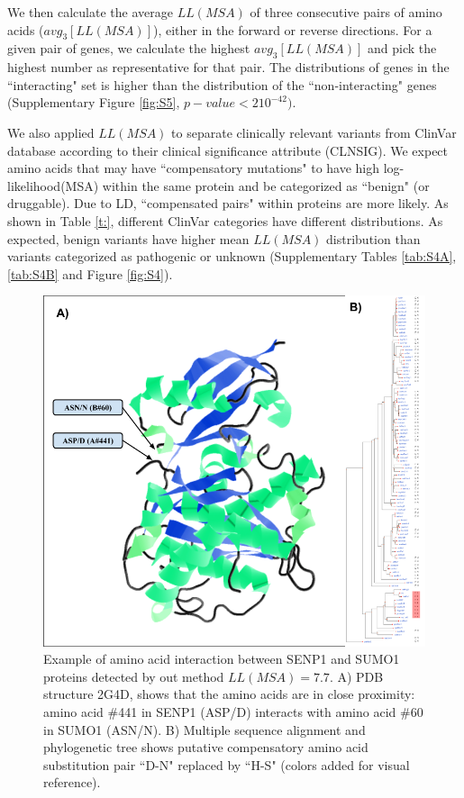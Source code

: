 We then calculate the average $LL(MSA)$ of three consecutive pairs of amino acids ($avg_3[LL(MSA)]$), either in the forward or reverse directions. For a given pair of genes, we calculate the highest $avg_3[LL(MSA)]$ and pick the highest number as representative for that pair. The distributions of genes in the ``interacting" set is higher than the distribution of the  ``non-interacting" genes (Supplementary Figure \ref{fig:S5}, $p-value < 2 10^{-42})$.

We also applied $LL(MSA)$ to separate clinically relevant variants from ClinVar database \cite{REF} according to their clinical significance attribute (CLNSIG). We expect amino acids that may have ``compensatory mutations" to have high log-likelihood(MSA) within the same protein and be categorized as ``benign" (or druggable). Due to LD, ``compensated pairs" within proteins are more likely. As shown in Table \ref{t:}, different ClinVar categories have different distributions. As expected, benign variants have higher mean $LL(MSA)$ distribution than variants categorized as pathogenic or unknown (Supplementary Tables \ref{tab:S4A}, \ref{tab:S4B} and Figure \ref{fig:S4}).

\begin{figure}
    \centering
    \includegraphics[width=14cm]{gwas_figure_jmol_epistasis.png}
	\caption{Example of amino acid interaction between SENP1 and SUMO1 proteins detected by out method $LL(MSA) = 7.7$. A) PDB structure 2G4D, shows that the amino acids are in close proximity: amino acid \#441 in SENP1 (ASP/D) interacts with amino acid \#60 in SUMO1 (ASN/N). B) Multiple sequence alignment and phylogenetic tree shows putative compensatory amino acid substitution pair ``D-N" replaced by ``H-S" (colors added for visual reference).}
    \label{fig:gwasf3a}
\end{figure}

